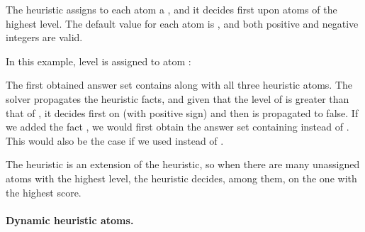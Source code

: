 The  heuristic assigns to each atom a , and it decides first upon atoms of the highest level.
The default value for each atom is ,  and both positive and negative integers are valid.
\begin{example} 
\label{example:level}
In this example,  
level  is assigned to atom :

The first obtained answer set contains  along with all three heuristic atoms.
The solver propagates the heuristic facts, and given that the level of  is greater than that of ,
it decides first on  (with positive sign) and then  is propagated to false.
If we added the fact , 
we would first obtain the answer set containing  instead of .
This would also be the case if we used  instead of .
\eexample
\end{example}

\begin{note}
The  heuristic is an extension of the  heuristic, 
so when there are many unassigned atoms with the highest level,
the heuristic decides, among them, on the one with the highest  score.
\end{note}

\paragraph{Dynamic heuristic atoms.}

